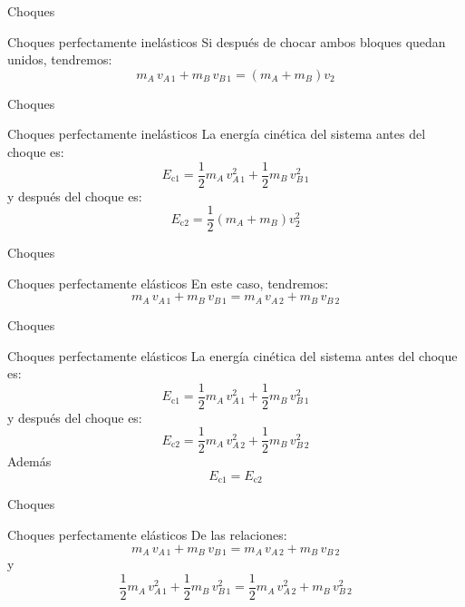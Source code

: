 \documentclass[11pt,handout,aspectratio=1610]{beamer}
\begin{document}
\begin{frame}{Choques}

    \begin{block}{Choques perfectamente inelásticos}
        Si después de chocar ambos bloques quedan unidos, tendremos:
        $$m_A \, v_{A \, 1} + m_B \, v_{B\,1} = \left(m_A + m_B\right) v_2$$
    \end{block}

\end{frame}

\begin{frame}{Choques}

    \begin{block}{Choques perfectamente inelásticos}
        La energía cinética del sistema antes del choque es:
        $$E_{\text{c}1} = \frac{1}{2} m_A \, v_{A \, 1}^2 + \frac{1}{2} m_B \, v_{B\,1}^2$$ \pause y después del choque es: $$E_{\text{c}2} = \frac{1}{2} \left(m_A + m_B\right) v_2^2$$
    \end{block}

\end{frame}

\begin{frame}{Choques}

    \begin{block}{Choques perfectamente elásticos}
        En este caso, tendremos:
        $$m_A \, v_{A \, 1} + m_B \, v_{B\,1} = m_A \, v_{A \, 2} + m_B \, v_{B \, 2}$$
    \end{block}

\end{frame}

\begin{frame}{Choques}

    \begin{block}{Choques perfectamente elásticos}
        La energía cinética del sistema antes del choque es:
        $$E_{\text{c}1} = \frac{1}{2} m_A \, v_{A \, 1}^2 + \frac{1}{2} m_B \, v_{B\,1}^2$$ \pause y después del choque es: $$E_{\text{c}2} = \frac{1}{2} m_A \, v_{A \, 2}^2 + \frac{1}{2} m_B \, v_{B \, 2}^2 $$ \pause Además $$E_{\text{c}1} = E_{\text{c}2}$$
    \end{block}

\end{frame}

\begin{frame}{Choques}

    \begin{block}{Choques perfectamente elásticos}
        De las relaciones:
        $$m_A \, v_{A \, 1} + m_B \, v_{B\,1} = m_A \, v_{A \, 2} + m_B \, v_{B \, 2}$$ y $$\frac{1}{2} m_A \, v_{A \, 1}^2 + \frac{1}{2} m_B \, v_{B\,1}^2 = \frac{1}{2} m_A \, v_{A \, 2}^2 + m_B \, v_{B \, 2}^2$$
    \end{block}

\end{frame}
\end{document}
